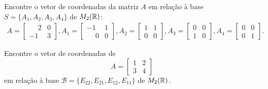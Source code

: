 \documentclass[12pt]{exam}
\begin{document}
    \begin{exercicio}
        Encontre o vetor de coordenadas da matriz $A$ em relação à base $S = \{A_1, A_2, A_3, A_4\}$ de $M_2(\mathbb{R})$:
        \begin{align*}
            A = \begin{bmatrix}
                \phantom{-} 2 & 0\\
                -1 & 3
            \end{bmatrix},
            A_1 = \begin{bmatrix}
                -1 & 1\\
                \phantom{-} 0 & 0
            \end{bmatrix},
            A_2 = \begin{bmatrix}
                1 & 1\\
                0 & 0
            \end{bmatrix},
            A_3 = \begin{bmatrix}
                0 & 0\\
                1 & 0
            \end{bmatrix},
            A_4 = \begin{bmatrix}
                0 & 0\\
                0 & 1
            \end{bmatrix}.
        \end{align*}
    \end{exercicio}


    \begin{exercicio}
        Encontre o vetor de coordenadas de
        \[
        A = \begin{bmatrix}
            1 & 2\\
            3 & 4
        \end{bmatrix}
        \]
        em relação à base $\mathcal{B} = \{E_{22}, E_{21}, E_{12}, E_{11}\}$ de $M_2(\mathbb{R})$.
    \end{exercicio}
\end{document}
